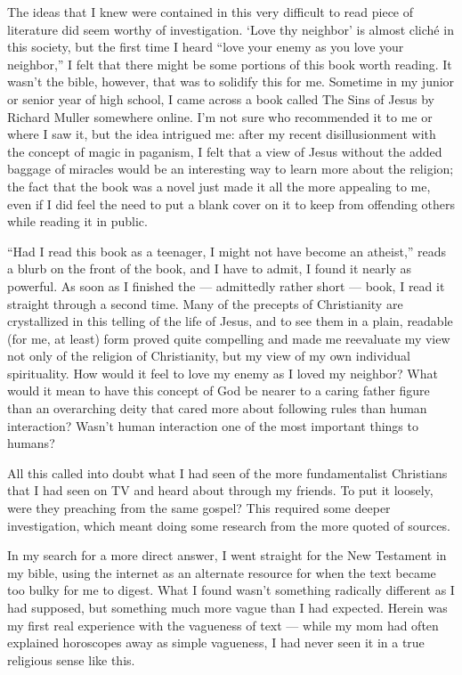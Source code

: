 \documentclass{book}
\begin{document}
The ideas that I knew were contained in this very difficult to read piece of literature did seem worthy of investigation.  `Love thy neighbor' is almost cliché in this society, but the first time I heard ``love your enemy as you love your neighbor,'' I felt that there might be some portions of this book worth reading.  It wasn't the bible, however, that was to solidify this for me.
Sometime in my junior or senior year of high school, I came across a book called The Sins of Jesus by Richard Muller somewhere online.  I'm not sure who recommended it to me or where I saw it, but the idea intrigued me: after my recent disillusionment with the concept of magic in paganism, I felt that a view of Jesus without the added baggage of miracles would be an interesting way to learn more about the religion; the fact that the book was a novel just made it all the more appealing to me, even if I did feel the need to put a blank cover on it to keep from offending others while reading it in public.

``Had I read this book as a teenager, I might not have become an atheist,'' reads a blurb on the front of the book, and I have to admit, I found it nearly as powerful.  As soon as I finished the --- admittedly rather short --- book, I read it straight through a second time.  Many of the precepts of Christianity are crystallized in this telling of the life of Jesus, and to see them in a plain, readable (for me, at least) form proved quite compelling and made me reevaluate my view not only of the religion of Christianity, but my view of my own individual spirituality.  How would it feel to love my enemy as I loved my neighbor? What would it mean to have this concept of God be nearer to a caring father figure than an overarching deity that cared more about following rules than human interaction? Wasn't human interaction one of the most important things to humans?

All this called into doubt what I had seen of the more fundamentalist Christians that I had seen on TV and heard about through my friends.  To put it loosely, were they preaching from the same gospel? This required some deeper investigation, which meant doing some research from the more quoted of sources.

In my search for a more direct answer, I went straight for the New Testament in my bible, using the internet as an alternate resource for when the text became too bulky for me to digest.  What I found wasn't something radically different as I had supposed, but something much more vague than I had expected.  Herein was my first real experience with the vagueness of text --- while my mom had often explained horoscopes away as simple vagueness, I had never seen it in a true religious sense like this.
\end{document}
